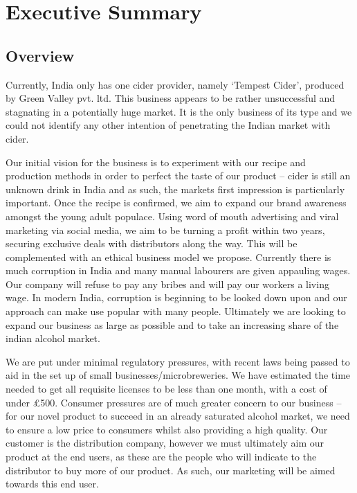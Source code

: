 \documentclass[11pt]{article}
\begin{document}
\newpage
\tableofcontents
\newpage


\section{Executive Summary}
\subsection{Overview}

Currently, India only has one cider provider, namely `Tempest Cider', produced
by Green Valley pvt. ltd. This business appears to be rather unsuccessful and
stagnating in a potentially huge market. It is the only business of its type and
we could not identify any other intention of penetrating the Indian market with
cider.

Our initial vision for the business is to experiment with our recipe and
production methods in order to perfect the taste of our product -- cider is
still an unknown drink in India and as such, the markets first impression is 
particularly important. Once the recipe is confirmed, we aim to expand our brand
awareness amongst the young adult populace. Using word of mouth advertising and 
viral marketing via social media, we aim to be turning a profit within two
years, securing exclusive deals with distributors along the way. This will be
complemented with an ethical business model we propose. Currently there is
much corruption in India and many manual labourers are given appauling wages. 
Our company will refuse to pay any bribes and will pay our workers a living
wage. In modern India, corruption is beginning to be looked down upon and our
approach can make use popular with many people. Ultimately we are looking to
expand our business as large as possible and to take an increasing share of the
indian alcohol market.

We are put under minimal regulatory pressures, with recent laws being passed
to aid in the set up of small businesses/microbreweries. We have estimated
the time needed to get all requisite licenses to be less than one month,
with a cost of under \pounds 500. Consumer pressures are of much greater concern 
to our business -- for our novel product to succeed in an already saturated
alcohol market, we need to ensure a low price to consumers whilst also
providing a high quality. Our customer is the distribution company, however
we must ultimately aim our product at the end users, as these are the people
who will indicate to the distributor to buy more of our product. As such, our
marketing will be aimed towards this end user.
\end{document}
